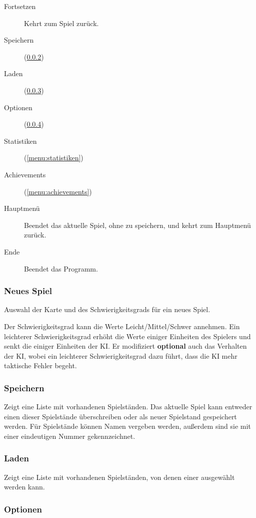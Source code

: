 \begin{description}
  \item[Fortsetzen] Kehrt zum Spiel zurück.
  \item[Speichern] (\ref{menu:speichern})
  \item[Laden] (\ref{menu:laden})
  \item[Optionen] (\ref{menu:optionen})
  \item[Statistiken] (\ref{menu:statistiken})
  \item[Achievements] (\ref{menu:achievements})
  \item[Hauptmenü] Beendet das aktuelle Spiel, ohne zu speichern, und kehrt
    zum Hauptmenü zurück.
  \item[Ende] Beendet das Programm.
\end{description}

\subsubsection{Neues Spiel}
\label{menu:neues_spiel}

Auswahl der Karte und des Schwierigkeitsgrads für ein neues Spiel.

Der Schwierigkeitsgrad kann die Werte Leicht/Mittel/Schwer annehmen. Ein
leichterer Schwierigkeitsgrad erhöht die Werte einiger Einheiten des
Spielers und senkt die einiger Einheiten der KI. Er modifiziert \textbf{optional}
auch das Verhalten der KI, wobei ein leichterer Schwierigkeitsgrad dazu führt,
dass die KI mehr taktische Fehler begeht.

\subsubsection{Speichern}
\label{menu:speichern}

Zeigt eine Liste mit vorhandenen Spielständen. Das aktuelle Spiel kann entweder
einen dieser Spielstände überschreiben oder als neuer Spielstand gespeichert
werden. Für Spielstände können Namen vergeben werden, außerdem sind sie mit
einer eindeutigen Nummer gekennzeichnet.

\subsubsection{Laden}
\label{menu:laden}

Zeigt eine Liste mit vorhandenen Spielständen, von denen einer ausgewählt
werden kann.

\subsubsection{Optionen}
\label{menu:optionen}

